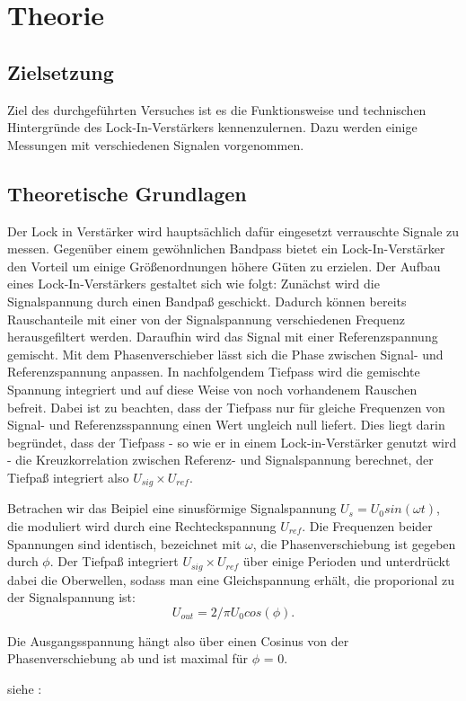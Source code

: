 \section{Theorie}
\label{sec:Theorie}
\subsection{Zielsetzung}
\label{sec:Zielsetzung}
Ziel des durchgeführten Versuches ist es die Funktionsweise und technischen
Hintergründe des Lock-In-Verstärkers kennenzulernen. Dazu werden einige
Messungen mit verschiedenen Signalen vorgenommen.

\subsection{Theoretische Grundlagen}
\label{sec:Grundlagen}
Der Lock in Verstärker wird hauptsächlich dafür eingesetzt verrauschte Signale
zu messen. Gegenüber einem gewöhnlichen Bandpass bietet ein Lock-In-Verstärker
den Vorteil um einige Größenordnungen höhere Güten zu erzielen.
Der Aufbau eines Lock-In-Verstärkers gestaltet sich wie folgt:
Zunächst wird die Signalspannung durch einen Bandpaß geschickt. Dadurch
können bereits Rauschanteile mit einer von der Signalspannung verschiedenen
Frequenz herausgefiltert werden.
Daraufhin wird das Signal mit einer Referenzspannung gemischt. Mit dem
Phasenverschieber lässt sich die Phase zwischen Signal- und Referenzspannung
anpassen.
In nachfolgendem Tiefpass wird die gemischte Spannung integriert und auf diese
Weise von noch vorhandenem Rauschen befreit. Dabei ist zu beachten, dass der
Tiefpass nur für gleiche Frequenzen von Signal- und Referenzsspannung
einen Wert ungleich null liefert. Dies liegt
darin begründet, dass der Tiefpass - so wie er in einem Lock-in-Verstärker
genutzt wird - die Kreuzkorrelation zwischen Referenz- und Signalspannung
berechnet, der Tiefpaß integriert also $U_{sig} \times U_{ref}$.

Betrachen wir das Beipiel eine sinusförmige Signalspannung $U_s = U_0 sin(\omega
t)$, die moduliert wird durch eine Rechteckspannung $U_{ref}$. Die Frequenzen
beider Spannungen sind identisch, bezeichnet mit $\omega$,
die Phasenverschiebung ist gegeben durch $\phi$.
Der Tiefpaß integriert $U_{sig} \times U_{ref}$ über einige Perioden und
unterdrückt dabei die Oberwellen, sodass man eine Gleichspannung erhält, die
proporional zu der Signalspannung ist:
\begin{equation}
U_{out} = 2/\pi U_0cos(\phi).
\label{eqn:Uout}
\end{equation}



Die Ausgangsspannung hängt also über einen Cosinus
von der Phasenverschiebung ab und ist maximal
für $\phi$ = 0.

siehe : \cite[1-3]{Anleitung}
